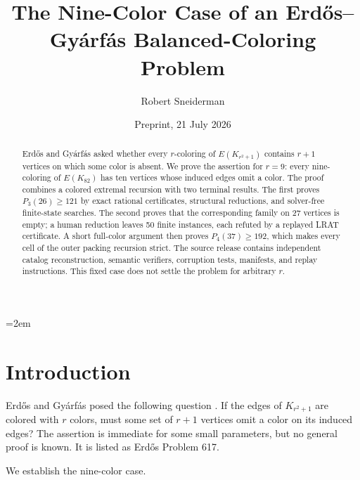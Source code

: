 \documentclass[11pt,reqno,a4paper]{amsart}
\title[The nine-color case]{The Nine-Color Case of an
Erd\H{o}s--Gy\'arf\'as Balanced-Coloring Problem}
\author{Robert Sneiderman}
\date{Preprint, 21 July 2026}
\theoremstyle{definition}
\theoremstyle{remark}
\begin{document}
\raggedbottom
\emergencystretch=2em

\begin{abstract}
Erd\H{o}s and Gy\'arf\'as asked whether every $r$-coloring of
$E(K_{r^2+1})$ contains $r+1$ vertices on which some color is absent.
We prove the assertion for $r=9$: every nine-coloring of $E(K_{82})$
has ten vertices whose induced edges omit a color. The proof combines a
colored extremal recursion with two terminal results. The first proves
$P_3(26)\ge121$ by exact rational certificates, structural reductions,
and solver-free finite-state searches. The second proves that the
corresponding family on 27 vertices is empty; a human reduction leaves
50 finite instances, each refuted by a replayed LRAT certificate. A
short full-color argument then proves $P_4(37)\ge192$, which makes every
cell of the outer packing recursion strict. The source release contains
independent catalog reconstruction, semantic verifiers, corruption tests,
manifests, and replay instructions. This fixed case does not settle the
problem for arbitrary $r$.
\end{abstract}

\maketitle

\begin{center}
\end{center}

\section{Introduction}\label{sec:introduction}

Erd\H{o}s and Gy\'arf\'as posed the following question
\cite{ErdosGyarfas1999}. If the edges of $K_{r^2+1}$ are colored with
$r$ colors, must some set of $r+1$ vertices omit a color on its induced
edges? The assertion is immediate for some small parameters, but no
general proof is known. It is listed as Erd\H{o}s Problem 617.

We establish the nine-color case.
\end{document}
